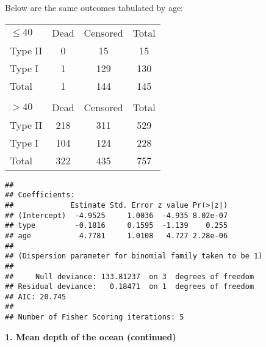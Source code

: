 \documentclass[10pt,handout]{beamer}\usepackage[]{graphicx}\usepackage[]{color}
\makeatletter
\newenvironment{kframe}{%
 \def\at@end@of@kframe{}%
 \ifinner\ifhmode%
  \def\at@end@of@kframe{\end{minipage}}%
  \begin{minipage}{\columnwidth}%
 \fi\fi%
 \def\FrameCommand##1{\hskip\@totalleftmargin \hskip-\fboxsep
 \colorbox{shadecolor}{##1}\hskip-\fboxsep
     \hskip-\linewidth \hskip-\@totalleftmargin \hskip\columnwidth}%
 \MakeFramed {\advance\hsize-\width
   \@totalleftmargin\z@ \linewidth\hsize
   \@setminipage}}%
 {\par\unskip\endMakeFramed%
 \at@end@of@kframe}
\newenvironment{knitrout}{}{} %
\makeatother
\begin{document}
\begin{frame}
	\vspace{-.81in}
\tiny
Below are the same outcomes tabulated by age:

\begin{table}[h]
	\begin{tabular}{lcc|c}
		$\leq 40$ & Dead &  Censored & Total\\
		Type II & 0 & 15 & 15 \\
		Type I & 1 & 129 & 130 \\
		\hline
		Total & 1 & 144 & 145 \\
		& & & \\
		$> 40$ & Dead &  Censored & Total\\
		Type II & 218 & 311 & 529 \\
		Type I & 104 & 124 & 228 \\
		\hline
		Total & 322 & 435 & 757 \\ 
	\end{tabular}
\end{table}

	\vspace{-.21in}
\begin{knitrout}\tiny
{}\color{fgcolor}\begin{kframe}
\begin{verbatim}
## 
## Coefficients:
##             Estimate Std. Error z value Pr(>|z|)
## (Intercept)  -4.9525     1.0036  -4.935 8.02e-07
## type         -0.1816     0.1595  -1.139    0.255
## age           4.7781     1.0108   4.727 2.28e-06
## 
## (Dispersion parameter for binomial family taken to be 1)
## 
##     Null deviance: 133.81237  on 3  degrees of freedom
## Residual deviance:   0.18471  on 1  degrees of freedom
## AIC: 20.745
## 
## Number of Fisher Scoring iterations: 5
\end{verbatim}
\end{kframe}
\end{knitrout}
\end{frame}

\begin{frame}
	\vspace*{-5.0in}
	\textbf{1. Mean depth of the ocean (continued)}
	
\end{frame}
\end{document}
